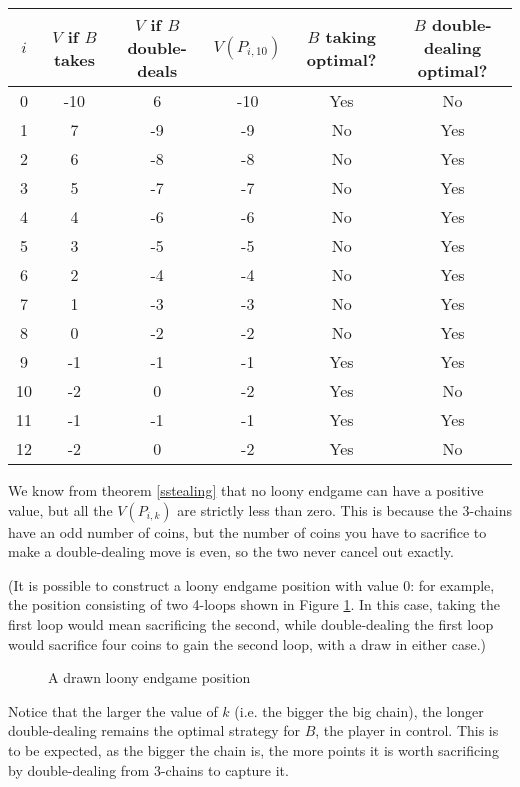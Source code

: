 \documentclass[a4paper,twocolumn]{article}
\begin{document}
\begin{table*}[p]
  \centering
  \begin{tabular}{c c c c c c}
    $i$ & $V$ if $B$ takes & $V$ if $B$ double-deals & $V(P_{i,10})$ & $B$ taking optimal? & $B$ double-dealing optimal? \\
    \hline
    0 & -10 & 6 & -10 & Yes & No \\
    1 & 7 & -9 & -9 & No & Yes \\
    2 & 6 & -8 & -8 & No & Yes \\
    3 & 5 & -7 & -7 & No & Yes \\
    4 & 4 & -6 & -6 & No & Yes \\
    5 & 3 & -5 & -5 & No & Yes \\
    6 & 2 & -4 & -4 & No & Yes \\
    7 & 1 & -3 & -3 & No & Yes \\
    8 & 0 & -2 & -2 & No & Yes \\
    9 & -1 & -1 & -1 & Yes & Yes \\
    10 & -2 & 0 & -2 & Yes & No \\
    11 & -1 & -1 & -1 & Yes & Yes \\
    12 & -2 & 0 & -2 & Yes & No
  \end{tabular}
  \caption{$k=10$}
  \label{vpik10}
\end{table*}

We know from theorem \ref{sstealing} that no loony endgame can have a
positive value, but all the $V(P_{i,k})$ are strictly less than
zero. This is because the 3-chains have an odd number of coins, but
the number of coins you have to sacrifice to make a double-dealing
move is even, so the two never cancel out exactly.

(It is possible to construct a loony endgame position with value 0:
for example, the position consisting of two 4-loops shown in Figure
\ref{drawnloony}. In this case, taking the first loop would mean
sacrificing the second, while double-dealing the first loop would
sacrifice four coins to gain the second loop, with a draw in either
case.)

\begin{figure}
  \centering
  \def\svgscale{0.7}
  
  \caption{A drawn loony endgame position}
  \label{drawnloony}
\end{figure}

Notice that the larger the value of $k$ (i.e. the bigger the big
chain), the longer double-dealing remains the optimal strategy for
$B$, the player in control. This is to be expected, as the bigger the
chain is, the more points it is worth sacrificing by double-dealing
from 3-chains to capture it.
\end{document}
